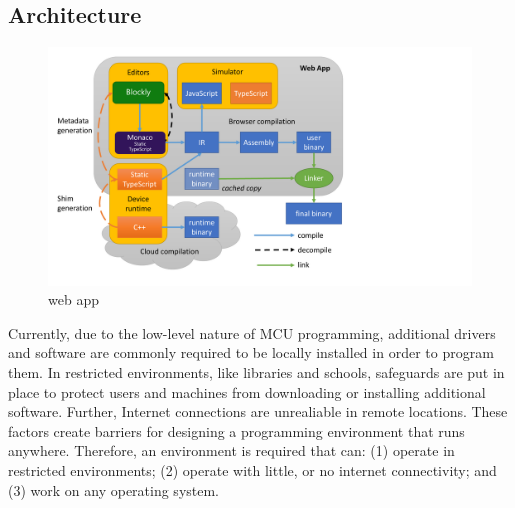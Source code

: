 




\subsection{Architecture}

\begin{figure}[t]
    \includegraphics[width=4.8in]{makecodeFig.pdf}
\caption{\label{fig:makecode}\MC web app}
\end{figure}

Currently, due to the low-level nature of MCU programming, additional drivers and software are commonly required to be locally installed in order to program them. In restricted environments, like libraries and schools, safeguards are put in place to protect users and machines from downloading or installing additional software. Further, Internet connections are unrealiable in remote locations. These factors create barriers for designing a programming environment that runs anywhere. Therefore, an environment is required that can: (1) operate in restricted environments; (2) operate with little, or no internet connectivity; and (3) work on any operating system.

